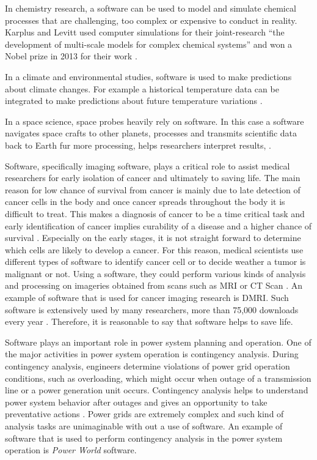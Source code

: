 In chemistry research, a software can be used to model and simulate chemical processes that are challenging, too complex or expensive to conduct in reality. Karplus and Levitt used computer simulations for their joint-research “the development of multi-scale models for complex chemical systems”  and won a Nobel prize in 2013 for their work \citep{storer2017bridging, andre2014nobel}. 

In a climate and environmental studies, software is used to make predictions about climate changes. For example a historical temperature data can be integrated to make predictions about future temperature variations \citep{storer2017bridging}.

In a space science, space probes heavily rely on software. In this case a software navigates space crafts to other planets, processes and transmits scientific data back to Earth fur more processing, helps researchers interpret results, \citep{lutz2011software}. 

Software, specifically imaging software, plays a critical role to assist medical researchers for early isolation of cancer and ultimately to saving life.  The main reason for low chance of survival from cancer is mainly due to late detection of cancer cells in the body  and once cancer spreads throughout the body it is difficult to treat. This makes a diagnosis of cancer to be a time critical task and early identification of cancer implies curability of a disease and a higher chance of survival \citep{wagner2004challenges}. Especially on the early stages, it is not straight forward to determine which cells are likely to develop a cancer. For this reason, medical scientists use different types of software to identify cancer cell or to decide weather a tumor is malignant or not. Using a software, they could perform various kinds of analysis and processing on imageries obtained from scans such as \ac{MRI} or \ac{CT} Scan \citep{al2012lung}. An example of software that is used for cancer imaging research is DMRI. Such software is extensively used by many researchers, more than 75,000 downloads every year \citep{norton2017slicerdmri}. Therefore, it is reasonable to say that software helps to save life.

Software plays an important role in power system planning and operation. One of the major activities in power system operation is contingency analysis. During contingency analysis, engineers determine violations of power grid operation conditions, such as overloading, which might occur when outage of a transmission line or a power generation unit occurs. Contingency analysis helps to understand power system behavior after outages and gives an opportunity to take preventative actions \citep{mishra2012contingency}. Power grids are extremely complex and such kind of analysis tasks are unimaginable with out a use of software. An example of software that is used to perform contingency analysis in the power system operation is \emph{Power World} software.  

